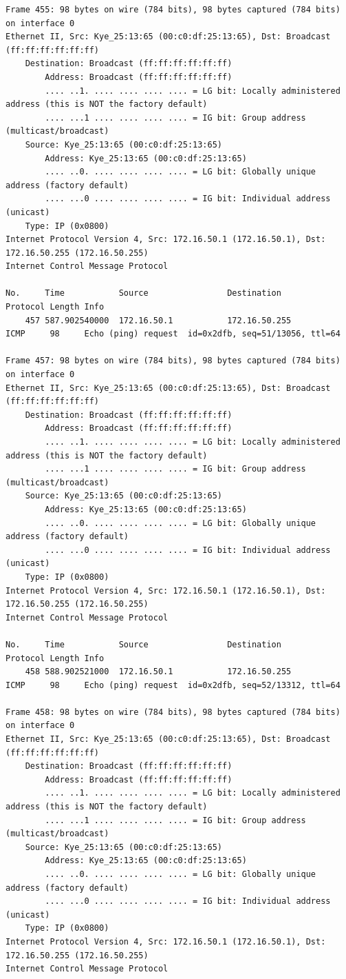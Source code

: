 \documentclass[a4paper,11pt]{article}
\begin{document}
\begin{lstlisting}
Frame 455: 98 bytes on wire (784 bits), 98 bytes captured (784 bits) on interface 0
Ethernet II, Src: Kye_25:13:65 (00:c0:df:25:13:65), Dst: Broadcast (ff:ff:ff:ff:ff:ff)
    Destination: Broadcast (ff:ff:ff:ff:ff:ff)
        Address: Broadcast (ff:ff:ff:ff:ff:ff)
        .... ..1. .... .... .... .... = LG bit: Locally administered address (this is NOT the factory default)
        .... ...1 .... .... .... .... = IG bit: Group address (multicast/broadcast)
    Source: Kye_25:13:65 (00:c0:df:25:13:65)
        Address: Kye_25:13:65 (00:c0:df:25:13:65)
        .... ..0. .... .... .... .... = LG bit: Globally unique address (factory default)
        .... ...0 .... .... .... .... = IG bit: Individual address (unicast)
    Type: IP (0x0800)
Internet Protocol Version 4, Src: 172.16.50.1 (172.16.50.1), Dst: 172.16.50.255 (172.16.50.255)
Internet Control Message Protocol

No.     Time           Source                Destination           Protocol Length Info
    457 587.902540000  172.16.50.1           172.16.50.255         ICMP     98     Echo (ping) request  id=0x2dfb, seq=51/13056, ttl=64

Frame 457: 98 bytes on wire (784 bits), 98 bytes captured (784 bits) on interface 0
Ethernet II, Src: Kye_25:13:65 (00:c0:df:25:13:65), Dst: Broadcast (ff:ff:ff:ff:ff:ff)
    Destination: Broadcast (ff:ff:ff:ff:ff:ff)
        Address: Broadcast (ff:ff:ff:ff:ff:ff)
        .... ..1. .... .... .... .... = LG bit: Locally administered address (this is NOT the factory default)
        .... ...1 .... .... .... .... = IG bit: Group address (multicast/broadcast)
    Source: Kye_25:13:65 (00:c0:df:25:13:65)
        Address: Kye_25:13:65 (00:c0:df:25:13:65)
        .... ..0. .... .... .... .... = LG bit: Globally unique address (factory default)
        .... ...0 .... .... .... .... = IG bit: Individual address (unicast)
    Type: IP (0x0800)
Internet Protocol Version 4, Src: 172.16.50.1 (172.16.50.1), Dst: 172.16.50.255 (172.16.50.255)
Internet Control Message Protocol

No.     Time           Source                Destination           Protocol Length Info
    458 588.902521000  172.16.50.1           172.16.50.255         ICMP     98     Echo (ping) request  id=0x2dfb, seq=52/13312, ttl=64

Frame 458: 98 bytes on wire (784 bits), 98 bytes captured (784 bits) on interface 0
Ethernet II, Src: Kye_25:13:65 (00:c0:df:25:13:65), Dst: Broadcast (ff:ff:ff:ff:ff:ff)
    Destination: Broadcast (ff:ff:ff:ff:ff:ff)
        Address: Broadcast (ff:ff:ff:ff:ff:ff)
        .... ..1. .... .... .... .... = LG bit: Locally administered address (this is NOT the factory default)
        .... ...1 .... .... .... .... = IG bit: Group address (multicast/broadcast)
    Source: Kye_25:13:65 (00:c0:df:25:13:65)
        Address: Kye_25:13:65 (00:c0:df:25:13:65)
        .... ..0. .... .... .... .... = LG bit: Globally unique address (factory default)
        .... ...0 .... .... .... .... = IG bit: Individual address (unicast)
    Type: IP (0x0800)
Internet Protocol Version 4, Src: 172.16.50.1 (172.16.50.1), Dst: 172.16.50.255 (172.16.50.255)
Internet Control Message Protocol


\end{lstlisting}
\end{document}
